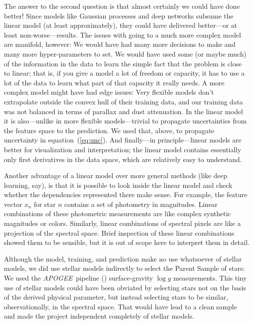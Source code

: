 \documentclass[modern]{aastex62}
\newcommand{\equationname}{equation}
\newcommand{\acronym}[1]{{\small{#1}}}
\newcommand{\project}[1]{\textsl{#1}}
\newcommand{\apogee}{\project{\acronym{APOGEE}}}
\newcommand{\logg}{\log g}
\begin{document}
The answer to the second question is that almost certainly we could have done better!
Since models like Gaussian processes and deep networks subsume the linear model
(at least approximately), they could have delivered better---or at least non-worse---results.
The issues with going to a much more complex model are manifold, however:
We would have had many more decisions to make and many more hyper-parameters
to set.
We would have used some (or maybe much) of the information in the data to learn
the simple fact that the problem is close to linear; that is, if you give a model
a lot of freedom or capacity, it has to use a lot of the data to learn what part
of that capacity it really needs.
A more complex model might have had edge issues: Very flexible models don't extrapolate
outside the convex hull of their training data, and our training data was not
balanced in terms of parallax and dust attenuation.
In the  linear model it is also---unlike in more flexible models---trivial to propagate
uncertainties from the feature space to the prediction.
We used that, above, to propagate uncertainty in \equationname~(\ref{eq:unc}).
And finally---in principle---linear models are better for visualization and interpretation;
the linear model contains essentially only first derivatives in the data space, which are
relatively easy to understand.

Another  advantage of a linear model over more general methods (like deep learning, say),
is that it is possible to look inside
the linear model and check whether the dependencies represented there make sense.
For example, the feature vector $x_n$ for star $n$
contains a set of photometry in magnitudes.
Linear combinations of these photometric measurements are like complex synthetic
magnitudes or colors.
Similarly, linear combinations of spectral pixels are like a projection of the spectral space.
Brief inspection of these linear combinations showed them to be sensible, but it is out of
scope here to interpret them in detail.

Although the model, training, and prediction make no use whatsoever of stellar
models, we did use stellar models indirectly to select the Parent Sample of stars:
We used the \apogee\ pipeline (\citealt{aspcap}) surface-gravity $\logg$ measurements.
This tiny use of stellar models could have been obviated by selecting stars not
on the basis of the derived physical parameter, but instead selecting stars to
be similar, observationally, in the spectral space.
That would have lead to a clean sample and made the project independent completely
of stellar models.
\end{document}
